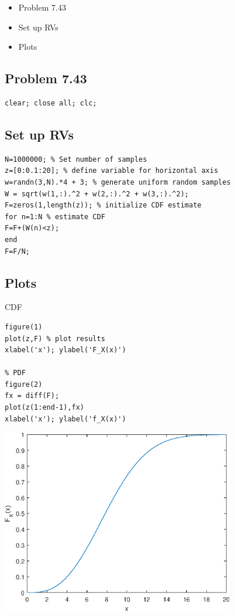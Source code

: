 \documentclass[12pt]{article}
\begin{document}
\begin{itemize}
\setlength{\itemsep}{-1ex}
   \item Problem 7.43
   \item Set up RVs
   \item Plots
\end{itemize}


\subsection*{Problem 7.43}

\begin{verbatim}
clear; close all; clc;
\end{verbatim}


\subsection*{Set up RVs}

\begin{verbatim}
N=1000000; % Set number of samples
z=[0:0.1:20]; % define variable for horizontal axis
w=randn(3,N).*4 + 3; % generate uniform random samples
W = sqrt(w(1,:).^2 + w(2,:).^2 + w(3,:).^2);
F=zeros(1,length(z)); % initialize CDF estimate
for n=1:N % estimate CDF
F=F+(W(n)<z);
end
F=F/N;
\end{verbatim}


\subsection*{Plots}

\begin{par}
CDF
\end{par} \vspace{1em}
\begin{verbatim}
figure(1)
plot(z,F) % plot results
xlabel('x'); ylabel('F_X(x)')

% PDF
figure(2)
fx = diff(F);
plot(z(1:end-1),fx)
xlabel('x'); ylabel('f_X(x)')
\end{verbatim}

\includegraphics [width=4in]{prob7_43_01.eps}
\end{document}
